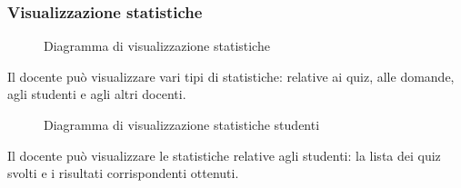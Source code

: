 \documentclass[a4paper, titlepage]{article}
\begin{document}
\subsubsection{Visualizzazione statistiche}
\begin{figure}[H]
	\centering
	\noindent{}
	\caption{Diagramma di visualizzazione statistiche}
\end{figure}
Il docente può visualizzare vari tipi di statistiche: relative ai quiz, alle domande, agli studenti e agli altri docenti.

\newpage
{}
\begin{figure}[H]
	\centering
	\noindent{}
	\caption{Diagramma di visualizzazione statistiche studenti}
\end{figure}
Il docente può visualizzare le statistiche relative agli studenti: 
la lista dei quiz svolti e i risultati corrispondenti ottenuti.
\end{document}
